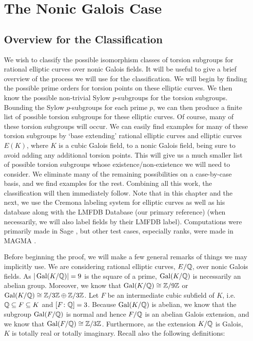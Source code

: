\chapter{The Nonic Galois Case}

\section{Overview for the Classification\label{sec:nonicoverview}}

We wish to classify the possible isomorphism classes of torsion subgroups for rational elliptic curves over nonic Galois fields. It will be useful to give a brief overview of the process we will use for the classification. We will begin by finding the possible prime orders for torsion points on these elliptic curves. We then know the possible non-trivial Sylow $p$-subgroups for the torsion subgroups. Bounding the Sylow $p$-subgroups for each prime $p$, we can then produce a finite list of possible torsion subgroups for these elliptic curves. Of course, many of these torsion subgroups will occur. We can easily find examples for many of these torsion subgroups by `base extending' rational elliptic curves and elliptic curves $E(K)$, where $K$ is a cubic Galois field, to a nonic Galois field, being sure to avoid adding any additional torsion points. This will give us a much smaller list of possible torsion subgroups whose existence/non-existence we will need to consider. We eliminate many of the remaining possibilities on a case-by-case basis, and we find examples for the rest. Combining all this work, the classification will then immediately follow. Note that in this chapter and the next, we use the Cremona \cite{cremonadat} labeling system for elliptic curves as well as his database along with the LMFDB Database (our primary reference) \cite{lmfdb} (when necessarily, we will also label fields by their LMFDB label). Computations were primarily made in Sage \cite{sage}, but other test cases, especially ranks, were made in MAGMA \cite{magma1,magma2}. 


Before beginning the proof, we will make a few general remarks of things we may implicitly use. We are considering rational elliptic curves, $E/\mathbb{Q}$, over nonic Galois fields. As $|\operatorname{Gal}(K/\mathbb{Q})|= 9$ is the square of a prime, $\operatorname{Gal}(K/\mathbb{Q})$ is necessarily an abelian group. Moreover, we know that $\operatorname{Gal}(K/\mathbb{Q}) \cong \mathbb{Z}/9\mathbb{Z}$ or $\operatorname{Gal}(K/\mathbb{Q}) \cong \mathbb{Z}/3\mathbb{Z} \oplus \mathbb{Z}/3\mathbb{Z}$. Let $F$ be an intermediate cubic subfield of $K$, i.e. $\mathbb{Q} \subseteq F \subseteq K$ and $[F \colon \mathbb{Q}]= 3$. Because $\operatorname{Gal}(K/\mathbb{Q})$ is abelian, we know that the subgroup $\operatorname{Gal}(F/\mathbb{Q})$ is normal and hence $F/\mathbb{Q}$ is an abelian Galois extension, and we know that $\operatorname{Gal}(F/\mathbb{Q}) \cong \mathbb{Z}/3\mathbb{Z}$. Furthermore, as the extension $K/\mathbb{Q}$ is Galois, $K$ is totally real or totally imaginary. Recall also the following definitions:

